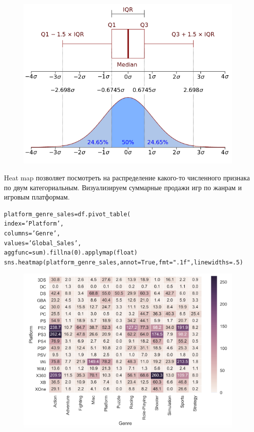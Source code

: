 \documentclass{beamer}
\begin{document}
\begin{frame}[fragile]
\begin{figure}[h]
\centering
\includegraphics[scale=0.6]{images/seaborn-08.png}
\end{figure}
\end{frame}

\begin{frame}[fragile]
Heat map позволяет посмотреть на распределение какого-то численного признака по двум категориальным. Визуализируем суммарные продажи игр по жанрам и игровым платформам.
\begin{alltt}
platform_genre_sales = df.pivot_table(
                        index='Platform', 
                        columns='Genre', 
                        values='Global_Sales', 
                        aggfunc=sum).fillna(0).applymap(float)
sns.heatmap(platform_genre_sales, annot=True, fmt=".1f", linewidths=.5)
\end{alltt}
\begin{figure}[h]
\centering
\includegraphics[scale=0.25]{images/seaborn-09.png}
\end{figure}
\end{frame}
\end{document}
